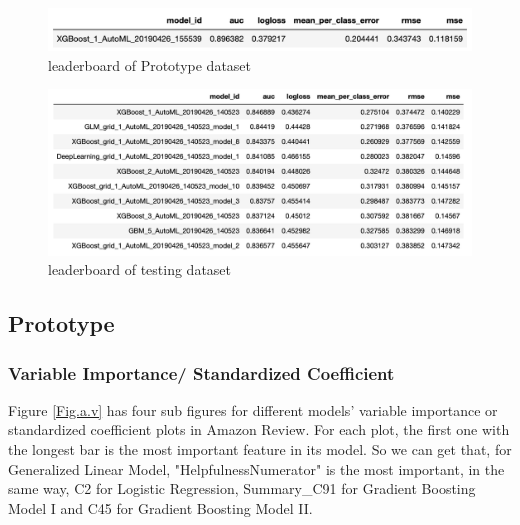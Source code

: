 \documentclass{article}
\begin{document}
\begin{figure}[ht]
\centering
\includegraphics[scale=0.6]{plots/amazon/leaderboard.png}
\caption{leaderboard of Prototype dataset}
\label{Fig.leaderboard_a}
\end{figure}

\begin{figure}[ht]
\centering
\includegraphics[scale=0.6]{plots/yelp/leaderboard.png}
\caption{leaderboard of testing dataset}
\label{Fig.leaderboard_y}
\end{figure}


\subsection{Prototype}


\subsubsection{Variable Importance/ Standardized Coefficient}
Figure \ref{Fig.a.v} has four sub figures for different models' variable importance or standardized coefficient plots in Amazon Review. For each plot, the first one with the longest bar is the most important feature in its model. So we can get that, for Generalized Linear Model, "HelpfulnessNumerator" is the most important, in the same way, C2 for Logistic Regression, Summary\_C91 for Gradient Boosting Model I and C45 for Gradient Boosting Model II.
\end{document}
